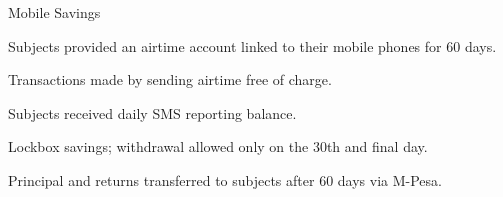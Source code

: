 \documentclass[aspectratio=169]{beamer}
\newenvironment{wideitemize}{\itemize\addtolength{\itemsep}{10pt}}{\enditemize}
\begin{document}
\begin{frame}{Mobile Savings}
	
	\begin{wideitemize}
		\item Subjects provided an airtime account linked to their mobile phones for 60 days.
		\item Transactions made by sending airtime free of charge.
		\item Subjects received daily SMS reporting balance.
		\item Lockbox savings; withdrawal allowed only on the 30th and final day.
		\item Principal and returns transferred to subjects after 60 days via M-Pesa.
	\end{wideitemize}



\end{frame}
\end{document}
